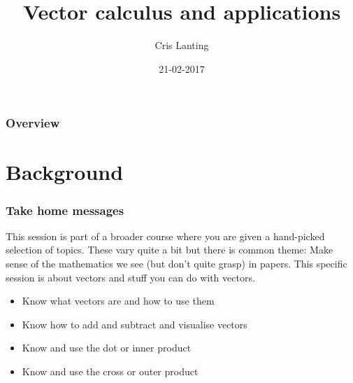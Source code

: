 \documentclass{beamer}
\title[Vectors and other useful stuf]{Vector calculus and applications} %
\author{Cris Lanting} %
\institute[UMCG] %
{
Clinical Physicist, Audiologist
University Medical Center Groningen \\ %
Dept. of Otorhinolaryngology\\
\medskip
\textit{c.p.lanting@umcg.nl\\
https://github.com/Crisly/MathcourseBCN2017}
} %
\date{21-02-2017} %
\begin{document}
\begin{frame}
\titlepage %
\end{frame}

\begin{frame}
\frametitle{Overview} %
\tableofcontents %
\end{frame}


\section{Background} %

\begin{frame}
\frametitle{Take home messages}
This session is part of a broader course where you are given a hand-picked selection of topics. These vary quite a bit but there is common theme:
Make sense of the mathematics we see (but don't quite grasp) in papers. This specific session is about vectors and stuff you can do with vectors.\\
\begin{itemize}
\item Know what vectors are and how to use them
\item Know how to add and subtract and visualise vectors 
\item Know and use the dot or inner product
\item Know and use the cross or outer product
\end{itemize}
\end{frame}
\end{document}
